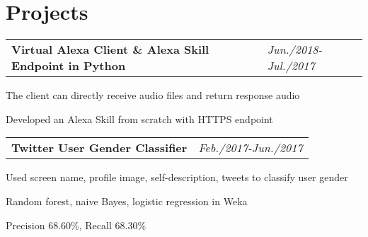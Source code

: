 \documentclass[a4paper,10pt]{article}
\newenvironment{packed_itemize}{
\begin{list}{\labelitemi}{\leftmargin=2em}
\setlength{\itemsep}{0pt}
\setlength{\parskip}{0pt}
\setlength{\parsep}{0pt}
\setlength{\headsep}{0pt}
\setlength{\topskip}{0pt}
\setlength{\topmargin}{0pt}
\setlength{\topsep}{0pt}
\setlength{\partopsep}{0pt}
}{\end{list}}
\begin{document}
\section{Projects}
\vspace{-0.2cm}

\begin{tabular}{p{15cm}p{3cm}}
\textbf{Virtual Alexa Client \& Alexa Skill Endpoint in Python} & \emph{Jun./2018-Jul./2017} \\
\end{tabular}

\begin{packed_itemize}
\item The client can directly receive audio files and return response audio \\
\item Developed an Alexa Skill from scratch with HTTPS endpoint\\
\end{packed_itemize}




\begin{tabular}{p{15cm}p{3cm}}
\textbf{Twitter User Gender Classifier} & \emph{Feb./2017-Jun./2017} \\
\end{tabular}

\begin{packed_itemize}
\item Used screen name, profile image, self-description, tweets to classify user gender \\
\item Random forest, naive Bayes, logistic regression in Weka \\
\item Precision 68.60\%, Recall 68.30\% \\
\end{packed_itemize}


\end{document}
